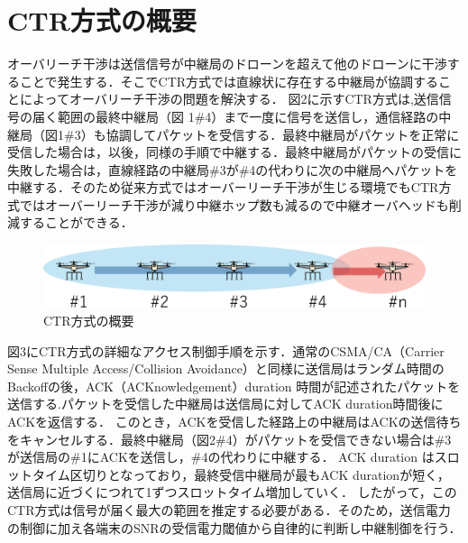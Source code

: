 \documentclass[a4paper,10pt]{ltjsarticle}
\begin{document}
\section{CTR方式の概要}
オーバリーチ干渉は送信信号が中継局のドローンを超えて他のドローンに干渉することで発生する．そこでCTR方式では直線状に存在する中継局が協調することによってオーバリーチ干渉の問題を解決する．
図2に示すCTR方式は,送信信号の届く範囲の最終中継局（図 1\#4）まで一度に信号を送信し，通信経路の中継局（図1\#3）も協調してパケットを受信する．最終中継局がパケットを正常に受信した場合は，以後，同様の手順で中継する．最終中継局がパケットの受信に失敗した場合は，直線経路の中継局\#3が\#4の代わりに次の中継局へパケットを中継する．そのため従来方式ではオーバーリーチ干渉が生じる環境でもCTR方式ではオーバーリーチ干渉が減り中継ホップ数も減るので中継オーバヘッドも削減することができる．%
\begin{figure}[H]
  \centering
  \includegraphics[width=\linewidth]{CTR_topology.pdf} %
  \caption{CTR方式の概要}
  \label{fig:CTR方式のトポロジー} %
\end{figure}
図3にCTR方式の詳細なアクセス制御手順を示す．通常のCSMA/CA（Carrier Sense Multiple Access/Collision Avoidance）と同様に送信局はランダム時間のBackoffの後，ACK（ACKnowledgement）duration
時間が記述されたパケットを送信する.パケットを受信した中継局は送信局に対してACK duration時間後にACKを返信する．
このとき，ACKを受信した経路上の中継局はACKの送信待ちをキャンセルする．最終中継局（図2\#4）がパケットを受信できない場合は\#3が送信局の\#1にACKを送信し，\#4の代わりに中継する．
ACK duration はスロットタイム区切りとなっており，最終受信中継局が最もACK durationが短く，送信局に近づくにつれて1ずつスロットタイム増加していく．
したがって，このCTR方式は信号が届く最大の範囲を推定する必要がある．そのため，送信電力の制御に加え各端末のSNRの受信電力閾値から自律的に判断し中継制御を行う．
\end{document}
